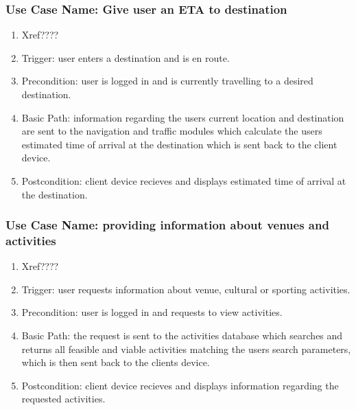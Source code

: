 \documentclass[11pt,a4paper]{article}
\begin{document}
			\subsubsection{Use Case Name: Give user an ETA to destination}
				\begin{enumerate}
				\renewcommand{\labelenumi}{{\textbf{\arabic{enumi}.}}}
				\item Xref????  %
				\item Trigger: user enters a destination and is en route.
				\item Precondition: user is logged in and is currently travelling to a desired destination.
				\item Basic Path: information regarding the users current location and destination are sent to the navigation and traffic modules which calculate the users estimated time of arrival at the destination which is sent back to the client device.
				\item Postcondition: client device recieves and displays estimated time of arrival at the destination.
				\end{enumerate}
				
			\subsubsection{Use Case Name: providing information about venues and activities }
				\begin{enumerate}
				\renewcommand{\labelenumi}{{\textbf{\arabic{enumi}.}}}
				\item Xref????  %
				\item Trigger: user requests information about venue, cultural or sporting activities.
				\item Precondition: user is logged in and requests to view activities.
				\item Basic Path: the request is sent to the activities database which searches and returns all feasible and viable activities matching the users search parameters, which is then sent back to the clients device.
				\item Postcondition: client device recieves and displays information regarding the requested activities.
				\end{enumerate}
				
\end{document}
